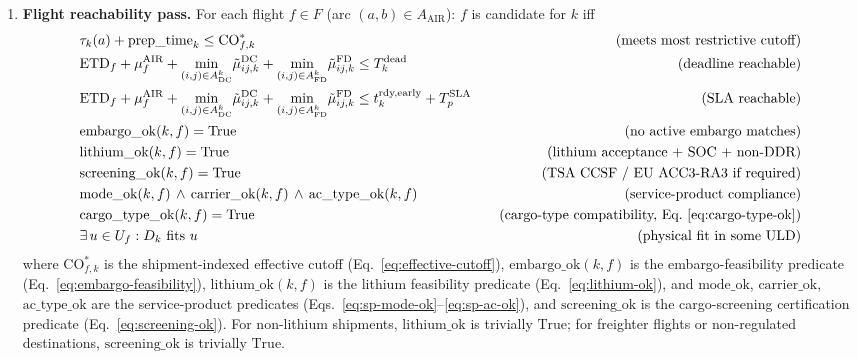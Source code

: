 \documentclass[11pt,a4paper]{article}
\theoremstyle{definition}
\begin{document}
\begin{enumerate}
  \item \textbf{Flight reachability pass.} For each flight $f \in F$ (arc $(a, b) \in A_{\text{AIR}}$):
        $f$ is candidate for $k$ iff
        \begin{align*}
          &\tau_k(a) + \text{prep\_time}_k \leq \text{CO}_{f,k}^* \quad &\text{(meets most restrictive cutoff)}\\
          &\text{ETD}_f + \mu_f^{\text{AIR}} + \min_{(i,j) \in A^k_{\text{DC}}}\!\tilde{\mu}^{\text{DC}}_{ij,k} + \min_{(i,j) \in A^k_{\text{FD}}}\!\tilde{\mu}^{\text{FD}}_{ij,k} \leq T_k^{\text{dead}} \quad &\text{(deadline reachable)}\\
          &\text{ETD}_f + \mu_f^{\text{AIR}} + \min_{(i,j) \in A^k_{\text{DC}}}\!\tilde{\mu}^{\text{DC}}_{ij,k} + \min_{(i,j) \in A^k_{\text{FD}}}\!\tilde{\mu}^{\text{FD}}_{ij,k} \leq t_k^{\text{rdy,early}} + T_p^{\text{SLA}} \quad &\text{(SLA reachable)}\\
          &\text{embargo\_ok}(k, f) = \text{True} \quad &\text{(no active embargo matches)}\\
          &\text{lithium\_ok}(k, f) = \text{True} \quad &\text{(lithium acceptance + SOC + non-DDR)}\\
          &\text{screening\_ok}(k, f) = \text{True} \quad &\text{(TSA CCSF / EU ACC3-RA3 if required)}\\
          &\text{mode\_ok}(k, f) \,\wedge\, \text{carrier\_ok}(k, f) \,\wedge\, \text{ac\_type\_ok}(k, f) \quad &\text{(service-product compliance)}\\
          &\text{cargo\_type\_ok}(k, f) = \text{True} \quad &\text{(cargo-type compatibility, Eq.~\ref{eq:cargo-type-ok})}\\
          &\exists\, u \in U_f : D_k \text{ fits } u  \quad &\text{(physical fit in some ULD)}
        \end{align*}
        where \(\text{CO}_{f,k}^*\) is the shipment-indexed effective cutoff (Eq.~\ref{eq:effective-cutoff}),
        \(\text{embargo\_ok}(k, f)\) is the embargo-feasibility predicate
        (Eq.~\ref{eq:embargo-feasibility}), \(\text{lithium\_ok}(k, f)\) is the
        lithium feasibility predicate (Eq.~\ref{eq:lithium-ok}), and
        $\text{mode\_ok}$, $\text{carrier\_ok}$, $\text{ac\_type\_ok}$ are the
        service-product predicates (Eqs.~\ref{eq:sp-mode-ok}--\ref{eq:sp-ac-ok}), and
        $\text{screening\_ok}$ is the cargo-screening certification predicate
        (Eq.~\ref{eq:screening-ok}). For non-lithium shipments, \(\text{lithium\_ok}\)
        is trivially \(\text{True}\); for freighter flights or non-regulated
        destinations, $\text{screening\_ok}$ is trivially \(\text{True}\).


\end{enumerate}
\end{document}
